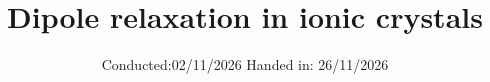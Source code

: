 


\subject{V48}
\title{Dipole relaxation in ionic crystals}
\date{%
  Conducted:02/11/2026
  \hspace{3em}
  Handed in: 26/11/2026
}



\maketitle
\thispagestyle{empty}
\tableofcontents
\newpage








\newpage 
\printbibliography{}




